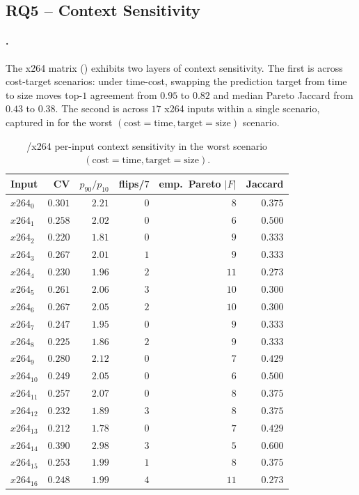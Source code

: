 \subsection{RQ5 -- Context Sensitivity}
\label{subsec:results-rq5}

\paragraph*{\StudyReplication.}
The x264 matrix () exhibits two layers
of context sensitivity. The first is across cost-target scenarios:
under time-cost, swapping the prediction target from time to size
moves top-$1$ agreement from $0.95$ to $0.82$ and median Pareto
Jaccard from $0.43$ to $0.38$. The second is across $17$ x264 inputs
within a single scenario, captured in  for
the worst $(\text{cost}\!=\!\text{time}, \text{target}\!=\!\text{size})$
scenario.

\begin{table}[t]
\centering
\caption{\StudyReplication/x264 per-input context sensitivity in the worst
scenario $(\text{cost}\!=\!\text{time}, \text{target}\!=\!\text{size})$.}
\label{tab:x264-per-input}
\footnotesize
\setlength{\tabcolsep}{4pt}
\begin{tabular}{l r r r r r}
\toprule
Input & CV & $p_{90}/p_{10}$ & flips/$7$ & emp.\ Pareto $|F|$ & Jaccard \\
\midrule
$x264_{0}$  & $0.301$ & $2.21$ & $0$ &  $8$ & $0.375$ \\
$x264_{1}$  & $0.258$ & $2.02$ & $0$ &  $6$ & $0.500$ \\
$x264_{2}$  & $0.220$ & $1.81$ & $0$ &  $9$ & $0.333$ \\
$x264_{3}$  & $0.267$ & $2.01$ & $1$ &  $9$ & $0.333$ \\
$x264_{4}$  & $0.230$ & $1.96$ & $2$ & $11$ & $0.273$ \\
$x264_{5}$  & $0.261$ & $2.06$ & $3$ & $10$ & $0.300$ \\
$x264_{6}$  & $0.267$ & $2.05$ & $2$ & $10$ & $0.300$ \\
$x264_{7}$  & $0.247$ & $1.95$ & $0$ &  $9$ & $0.333$ \\
$x264_{8}$  & $0.225$ & $1.86$ & $2$ &  $9$ & $0.333$ \\
$x264_{9}$  & $0.280$ & $2.12$ & $0$ &  $7$ & $0.429$ \\
$x264_{10}$ & $0.249$ & $2.05$ & $0$ &  $6$ & $0.500$ \\
$x264_{11}$ & $0.257$ & $2.07$ & $0$ &  $8$ & $0.375$ \\
$x264_{12}$ & $0.232$ & $1.89$ & $3$ &  $8$ & $0.375$ \\
$x264_{13}$ & $0.212$ & $1.78$ & $0$ &  $7$ & $0.429$ \\
$x264_{14}$ & $0.390$ & $2.98$ & $3$ &  $5$ & $0.600$ \\
$x264_{15}$ & $0.253$ & $1.99$ & $1$ &  $8$ & $0.375$ \\
$x264_{16}$ & $0.248$ & $1.99$ & $4$ & $11$ & $0.273$ \\
\bottomrule
\end{tabular}
\end{table}

